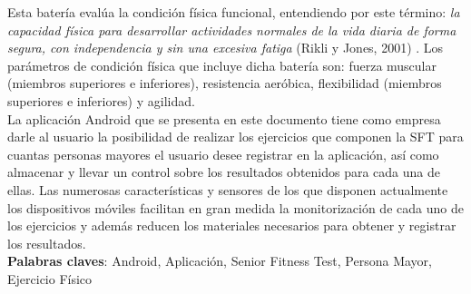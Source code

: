 Esta batería evalúa la condición física funcional, entendiendo por este término: \textit{la capacidad física para desarrollar actividades normales de la vida diaria de forma segura, con independencia y sin una excesiva fatiga} (Rikli y Jones, 2001) \cite{mitt04}. Los parámetros de condición física que incluye dicha batería son: fuerza muscular (miembros superiores e inferiores), resistencia aeróbica, flexibilidad (miembros superiores e inferiores) y agilidad.\\

La aplicación Android que se presenta en este documento tiene como empresa darle al usuario la posibilidad de realizar los ejercicios que componen la SFT para cuantas personas mayores el usuario desee registrar en la aplicación, así como almacenar y llevar un control sobre los resultados obtenidos para cada una de ellas. Las numerosas características y sensores de los que disponen actualmente los dispositivos móviles facilitan en gran medida la monitorización de cada uno de los ejercicios y además reducen los materiales necesarios para obtener y registrar los resultados.\\

\textbf{Palabras claves}: Android, Aplicación, Senior Fitness Test, Persona Mayor, Ejercicio Físico